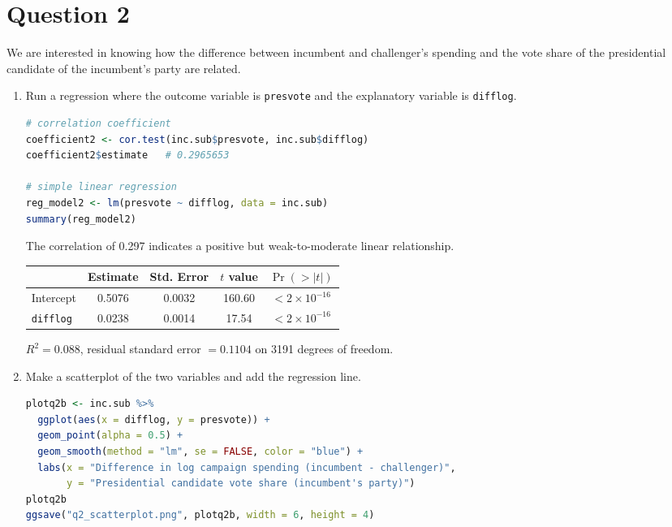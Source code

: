 \documentclass[12pt,letterpaper]{article}
\begin{document}
\section*{Question 2}
\vspace{.25cm}
\noindent We are interested in knowing how the difference between incumbent and challenger's spending and the vote share of the presidential candidate of the incumbent's party are related.
\begin{enumerate}

  \item Run a regression where the outcome variable is \texttt{presvote} and the explanatory variable is \texttt{difflog}.

\begin{lstlisting}[language=R]
# correlation coefficient
coefficient2 <- cor.test(inc.sub$presvote, inc.sub$difflog)
coefficient2$estimate   # 0.2965653

# simple linear regression
reg_model2 <- lm(presvote ~ difflog, data = inc.sub)
summary(reg_model2)
\end{lstlisting}

  The correlation of 0.297 indicates a positive but weak-to-moderate linear relationship.

  \begin{center}
  \begin{tabular}{lcccc}
    \hline
    & Estimate & Std. Error & $t$ value & $\Pr(>|t|)$ \\
    \hline
    Intercept & 0.5076 & 0.0032 & 160.60 & $<2\times10^{-16}$ \\
    \texttt{difflog} & 0.0238 & 0.0014 & 17.54 & $<2\times10^{-16}$ \\
    \hline
  \end{tabular}
  \end{center}
  \noindent $R^2 = 0.088$, residual standard error $= 0.1104$ on 3191 degrees of freedom.

  \item Make a scatterplot of the two variables and add the regression line.

\begin{lstlisting}[language=R]
plotq2b <- inc.sub %>%
  ggplot(aes(x = difflog, y = presvote)) +
  geom_point(alpha = 0.5) +
  geom_smooth(method = "lm", se = FALSE, color = "blue") +
  labs(x = "Difference in log campaign spending (incumbent - challenger)",
       y = "Presidential candidate vote share (incumbent's party)")
plotq2b
ggsave("q2_scatterplot.png", plotq2b, width = 6, height = 4)
\end{lstlisting}


\end{enumerate}
\end{document}
